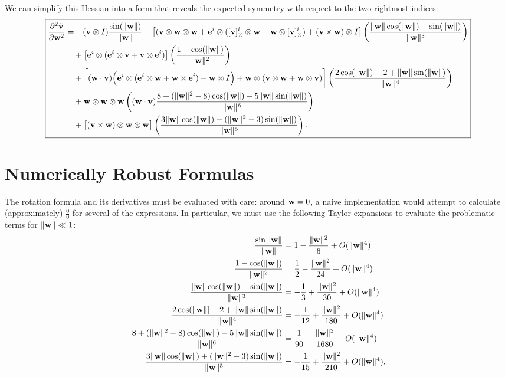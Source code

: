\documentclass[10pt]{article}
\providecommand{\norm}[1]{\lVert#1\rVert}
\providecommand{\cross}{\times}
\renewcommand{\vec}[1]{{\bf #1}}
\def\w{\vec{w}}
\def\wn{\norm{\w}}
\def\v{\vec{v}}
\def\e{\vec{e}}
\begin{document}
We can simplify this Hessian into a form that reveals the expected symmetry with respect to the two rightmost indices:
\begin{equation*}
\boxed{
\begin{aligned}
\frac{\partial^2 \tilde{\v}}{\partial \w^2}
&=
    -(\v \otimes I)  \frac{\sin(\wn)}{\wn}
    - \big[(\v \otimes \w \otimes \w + \e^i \otimes ([\v]_\cross^i \otimes \w + \w \otimes [\v]_\cross^i) + (\v \cross \w) \otimes I \big] \left(\frac{\wn \cos(\wn) - \sin(\wn)}{\wn^3}\right)
\\ &\quad
    + \big[ \e^i \otimes (\e^i \otimes \v +  \v \otimes \e^i) \big] \left(\frac{1 - \cos(\wn)}{\wn^2}\right)
\\ &\quad
    + \bigg[ (\w \cdot \v) \Big(\e^i \otimes (\e^i \otimes \w + \w \otimes \e^i) + \w \otimes I\Big) + \w \otimes (\v \otimes \w + \w \otimes \v) \bigg] \left(\frac{2 \cos(\wn) - 2 + \wn \sin(\wn)}{\wn^4}\right)
\\ &\quad
    + \w \otimes \w \otimes \w \left((\w \cdot \v) \frac{8 + (\wn^2 - 8) \cos(\wn) - 5 \wn \sin(\wn)}{\wn^6}\right)
\\ &\quad
    + \big[(\v \cross \w) \otimes \w \otimes \w\big]\left(\frac{3 \wn \cos(\wn) + (\wn^2 - 3) \sin(\wn)}{\wn^5}\right).
\end{aligned}
}
\end{equation*}

\clearpage
\section{Numerically Robust Formulas}
The rotation formula and its derivatives must be evaluated with care: around $\w = 0$, a naive implementation would
attempt to calculate (approximately) $\frac{0}{0}$ for several of the expressions. In particular, we must use the following
Taylor expansions to evaluate the problematic terms for $\wn \ll 1$:
\begin{align*}
\frac{\sin{\wn}}{\wn}                                    &= 1 - \frac{\wn^2}{6} + O(\wn^4) \\
\frac{1 - \cos(\wn)}{\wn^2}                              &= \frac{1}{2} - \frac{\wn^2}{24} + O(\wn^4) \\
\frac{\wn \cos(\wn) - \sin(\wn)}{\wn^3}                  &= -\frac{1}{3} + \frac{\wn^2}{30} + O(\wn^4) \\
\frac{2 \cos(\wn] - 2 + \wn \sin(\wn)}{\wn^4}            &= -\frac{1}{12} + \frac{\wn^2}{180} + O(\wn^4) \\
\frac{8 + (\wn^2 - 8)\cos(\wn) - 5 \wn \sin(\wn)}{\wn^6} &= \frac{1}{90} - \frac{\wn^2}{1680} + O(\wn^4) \\
\frac{3 \wn \cos(\wn) + (\wn^2 - 3) \sin(\wn)}{\wn^5}    &= -\frac{1}{15} + \frac{\wn^2}{210} + O(\wn^4).
\end{align*}
\end{document}
